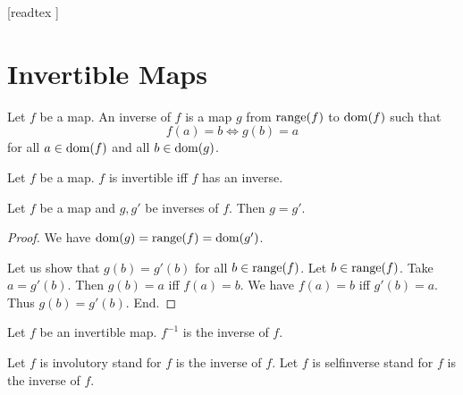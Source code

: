 \documentclass[10pt]{article}
\begin{document}
  \begin{imports}
    \begin{forthel}

      [readtex ]

    \end{forthel}
  \end{imports}


  \section{Invertible Maps}

  \begin{forthel}
    \begin{definition}
      Let $f$ be a map.
      An inverse of $f$ is a map $g$ from $\textrm{range}(f)$ to $\operatorname{dom}(f)$ such that
      \[ f(a) = b \iff g(b) = a \]
      for all $a \in \operatorname{dom}(f)$ and all $b \in \operatorname{dom}(g)$.
    \end{definition}
  \end{forthel}

  \begin{forthel}
    \begin{definition}
      Let $f$ be a map.
      $f$ is invertible iff $f$ has an inverse.
    \end{definition}
  \end{forthel}

  \begin{forthel}
    \begin{lemma}
      Let $f$ be a map and $g, g'$ be inverses of $f$.
      Then $g = g'$.
    \end{lemma}
    \begin{proof}
      We have $\operatorname{dom}(g) = \textrm{range}(f) = \operatorname{dom}(g')$.

      Let us show that $g(b) = g'(b)$ for all $b \in \textrm{range}(f)$.
        Let $b \in \textrm{range}(f)$.
        Take $a = g'(b)$.
        Then $g(b) = a$ iff $f(a) = b$.
        We have $f(a) = b$ iff $g'(b) = a$.
        Thus $g(b) = g'(b)$.
      End.
    \end{proof}
  \end{forthel}

  \begin{forthel}
    \begin{definition}
      Let $f$ be an invertible map.
      $f^{-1}$ is the inverse of $f$.
    \end{definition}

    Let $f$ is involutory stand for $f$ is the inverse of $f$.
    Let $f$ is selfinverse stand for $f$ is the inverse of $f$.
  \end{forthel}
\end{document}
